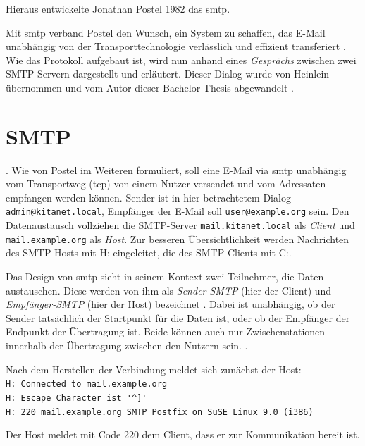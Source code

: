 Hieraus entwickelte Jonathan Postel 1982 das \acf{smtp}.

Mit \ac{smtp} verband Postel den Wunsch, ein System zu schaffen, das E-Mail unabhängig von der Transporttechnologie verlässlich und effizient transferiert \citep[vgl.][1]{rfc821}. Wie das Protokoll aufgebaut ist, wird nun anhand eines \textit{Gesprächs} zwischen zwei SMTP-Servern dargestellt und erläutert. Dieser Dialog wurde von Heinlein übernommen und vom Autor dieser Bachelor-Thesis abgewandelt \citep[vgl.][S. 24 ff.]{Heinlein2004}. 

\section{SMTP}

 \citep[][11]{rfc821}.
Wie von Postel im Weiteren formuliert, soll eine E-Mail via \ac{smtp} unabhängig vom Transportweg (\zb \ac{tcp}) von einem Nutzer versendet und vom Adressaten empfangen werden können. Sender ist in hier betrachtetem Dialog \verb+admin@kitanet.local+, Empfänger der E-Mail soll \verb+user@example.org+ sein. Den Datenaustausch vollziehen die SMTP-Server \verb+mail.kitanet.local+ als \textit{Client} und \verb+mail.example.org+ als \textit{Host}. Zur besseren Übersichtlichkeit werden Nachrichten des SMTP-Hosts mit H: eingeleitet, die des SMTP-Clients mit C:.

Das Design von \ac{smtp} sieht in seinem Kontext zwei Teilnehmer, die Daten austauschen. Diese werden von ihm als \textit{Sender-SMTP} (hier der Client) und \textit{Empfänger-SMTP} (hier der Host) bezeichnet \citep[vgl.][2]{rfc821}. Dabei ist unabhängig, ob der Sender tatsächlich der Startpunkt für die Daten ist, oder ob der Empfänger der Endpunkt der Übertragung ist. Beide können auch nur Zwischenstationen innerhalb der Übertragung zwischen den Nutzern sein.  \citep[][2]{rfc821}.

Nach dem Herstellen der Verbindung meldet sich zunächst der Host:\\
\verb+H: Connected to mail.example.org+ \\ 
\verb+H: Escape Character ist '^]'+ \\
\verb+H: 220 mail.example.org SMTP Postfix on SuSE Linux 9.0 (i386)+

Der Host meldet mit Code 220  \citep[][35]{rfc821} dem Client, dass er zur Kommunikation bereit ist. 


